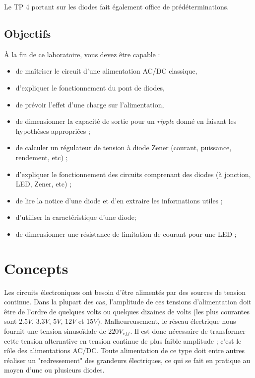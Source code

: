 \documentclass{../template/labo}
\begin{document}
Le TP 4 portant sur les diodes fait également office de prédéterminations.


\subsection{Objectifs}
À la fin de ce laboratoire, vous devez être capable :
\begin{itemize}
\item de maîtriser le circuit d'une alimentation AC/DC classique,
\item d'expliquer le fonctionnement du pont de diodes,
\item de prévoir l'effet d'une charge sur l'alimentation,
\item de dimensionner la capacité de sortie pour un \textit{ripple} donné en faisant les hypothèses appropriées ;
\item de calculer un régulateur de tension à diode Zener (courant, puissance, rendement, etc) ;
\item d'expliquer le fonctionnement des circuits comprenant des diodes (à jonction, LED, Zener, etc) ;
\item de lire la notice d'une diode et d'en extraire les informations utiles ;
\item d'utiliser la caractéristique d'une diode;
\item de dimensionner une résistance de limitation de courant pour une LED ;
\end{itemize}
\newpage
\pagestyle{fancy}

\section{Concepts}
Les circuits électroniques ont besoin d'être alimentés par des sources de tension continue. Dans la plupart des cas, l'amplitude de ces tensions d'alimentation doit être de l'ordre de quelques volts ou quelques dizaines de volts (les plus courantes sont $2.5V$, $3.3V$, $5V$, $12V$ et $15V$).
Malheureusement, le réseau électrique nous fournit une tension sinusoïdale de $220V_{eff}$. Il est donc nécessaire de transformer cette tension alternative en tension continue de plus faible amplitude ; c'est le rôle des alimentations AC/DC.
Toute alimentation de ce type doit entre autres réaliser un "redressement" des grandeurs électriques, ce qui se fait en pratique au moyen d'une ou plusieurs diodes.
 
\end{document}
